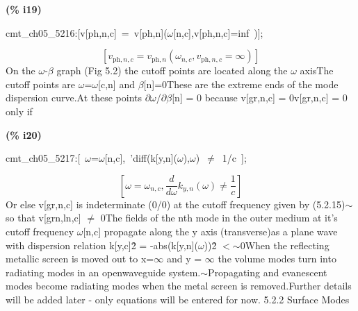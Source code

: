 \documentclass[fleqn]{article}
\begin{document}
\noindent
\begin{minipage}[t]{4.000000em}\color{red}\bfseries
(\% i19)	
\end{minipage}
\begin{minipage}[t]{\textwidth}\color{blue}
cmt\_ch05\_5216:[v[ph,n,c]\ =\ v[ph,n](\ensuremath{\omega}[n,c],v[ph,n,c]=inf\ )];
\end{minipage}
\[\displaystyle \tag{\% o19} 
\left[ {v_{\ensuremath{\mathrm{ph}},n,c}}={v_{\ensuremath{\mathrm{ph}},n}}\left( {{\omega }_{n,c}}\operatorname{,}{v_{\ensuremath{\mathrm{ph}},n,c}}=\infty \right) \right] \mbox{}
\]
On the \ensuremath{\omega}-\ensuremath{\beta} graph (Fig 5.2) the cutoff points are located along the \ensuremath{\omega} axisThe  cutoff points are \ensuremath{\omega}=\ensuremath{\omega}[c,n] and \ensuremath{\beta}[n]=0These are the extreme ends of the mode dispersion curve.At these points \ensuremath{\partial}\ensuremath{\omega}/\ensuremath{\partial}\ensuremath{\beta}[n] = 0 because v[gr,n,c] = 0v[gr,n,c] = 0 only if


\noindent
\begin{minipage}[t]{4.000000em}\color{red}\bfseries
(\% i20)	
\end{minipage}
\begin{minipage}[t]{\textwidth}\color{blue}
cmt\_ch05\_5217:[\ \ensuremath{\omega}=\ensuremath{\omega}[n,c],\ 'diff(k[y,n](\ensuremath{\omega}),\ensuremath{\omega})\ \ensuremath{\neq}\ 1/c\ ];
\end{minipage}
\[\displaystyle \tag{\% o20} 
\left[ \omega ={{\omega }_{n,c}}\operatorname{,}\frac{d}{d \omega } {k_{y,n}}\left( \omega \right) \operatorname{\neq }\frac{1}{c}\right] \mbox{}
\]
Or else  v[gr,n,c] is indeterminate (0/0) at the cutoff frequency given by (5.2.15)\ensuremath{\sim }so that v[grn,ln,c] \ensuremath{\neq} 0The fields of the nth mode in the outer medium at it's cutoff frequency \ensuremath{\omega}[n,c] propagate along the y axis (transverse)as a plane wave with dispersion relation k[y,c]\^ 2 = -abs(k[y,n](\ensuremath{\omega}))\^ 2 \ensuremath{<}\ensuremath{\sim }0When the reflecting metallic screen is moved out to x=\ensuremath{\infty} and y = \ensuremath{\infty} the volume modes turn into radiating modes in an openwaveguide system.\ensuremath{\sim }Propagating and evanescent modes become radiating modes when the metal screen is removed.Further details will be added later - only equations will be entered for now.
5.2.2 Surface Modes
\end{document}
